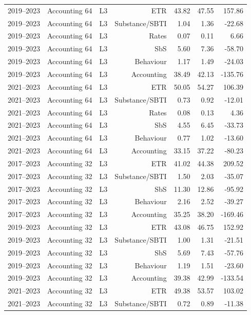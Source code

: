 {\begin{longtable}{@{}lrrrrrr@{}}
2019–2023 & Accounting 64 & L3 & ETR & 43.82 & 47.55 &  157.86 \\
2019–2023 & Accounting 64 & L3 & Substance/SBTI &  1.04 &  1.36 &  -22.68 \\
2019–2023 & Accounting 64 & L3 & Rates &  0.07 &  0.11 &    6.66 \\
2019–2023 & Accounting 64 & L3 & SbS &  5.60 &  7.36 &  -58.70 \\
2019–2023 & Accounting 64 & L3 & Behaviour &  1.17 &  1.49 &  -24.03 \\
2019–2023 & Accounting 64 & L3 & Accounting & 38.49 & 42.13 & -135.76 \\
2021–2023 & Accounting 64 & L3 & ETR & 50.05 & 54.27 &  106.39 \\
2021–2023 & Accounting 64 & L3 & Substance/SBTI &  0.73 &  0.92 &  -12.01 \\
2021–2023 & Accounting 64 & L3 & Rates &  0.08 &  0.13 &    4.36 \\
2021–2023 & Accounting 64 & L3 & SbS &  4.55 &  6.45 &  -33.73 \\
2021–2023 & Accounting 64 & L3 & Behaviour &  0.77 &  1.02 &  -13.60 \\
2021–2023 & Accounting 64 & L3 & Accounting & 33.15 & 37.22 &  -80.23 \\
2017–2023 & Accounting 32 & L3 & ETR & 41.02 & 44.38 &  209.52 \\
2017–2023 & Accounting 32 & L3 & Substance/SBTI &  1.50 &  2.03 &  -35.07 \\
2017–2023 & Accounting 32 & L3 & SbS & 11.30 & 12.86 &  -95.92 \\
2017–2023 & Accounting 32 & L3 & Behaviour &  2.16 &  2.52 &  -39.27 \\
2017–2023 & Accounting 32 & L3 & Accounting & 35.25 & 38.20 & -169.46 \\
2019–2023 & Accounting 32 & L3 & ETR & 43.08 & 46.75 &  152.92 \\
2019–2023 & Accounting 32 & L3 & Substance/SBTI &  1.00 &  1.31 &  -21.51 \\
2019–2023 & Accounting 32 & L3 & SbS &  5.69 &  7.43 &  -57.76 \\
2019–2023 & Accounting 32 & L3 & Behaviour &  1.19 &  1.51 &  -23.60 \\
2019–2023 & Accounting 32 & L3 & Accounting & 39.38 & 42.99 & -133.54 \\
2021–2023 & Accounting 32 & L3 & ETR & 49.38 & 53.57 &  103.02 \\
2021–2023 & Accounting 32 & L3 & Substance/SBTI &  0.72 &  0.89 &  -11.38 \\

\end{longtable}}
